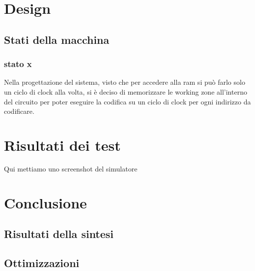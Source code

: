 \documentclass{article}
\begin{document}
\section{Design}
\subsection{Stati della macchina}
\subsubsection{stato x}
Nella progettazione del sistema, visto che per accedere alla ram si può farlo solo un ciclo di clock alla volta, si è deciso di memorizzare le working zone all'interno del circuito per poter eseguire la codifica su un ciclo di clock per ogni indirizzo da codificare.
\section{Risultati dei test}
Qui mettiamo uno screenshot del simulatore
\section{Conclusione}
\subsection{Risultati della sintesi}
\subsection{Ottimizzazioni}
\end{document}
